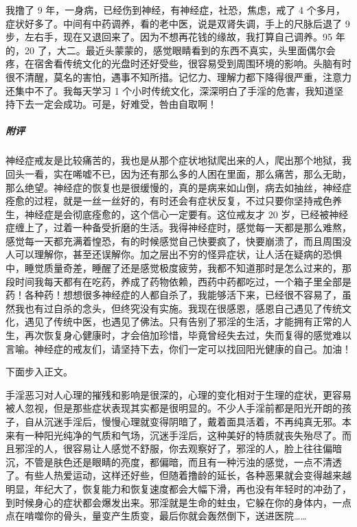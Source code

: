 \begin{case}
    我撸了 9 年，一身病，已经伤到神经，有神经症，社恐，焦虑，戒了 4 个多月，症状好多了。中间有中药调养，看的老中医，说是双肾失调，手上的尺脉后退了 9 步，左右手，现在又退回来了。因为不想再花钱的缘故，我打算自己调养。95 年的，20 了，大二。最近头蒙蒙的，感觉眼睛看到的东西不真实，头里面偶尔会疼，在宿舍看传统文化的光盘时还好受些，很容易受到周围环境的影响。头脑有时很不清醒，莫名的害怕，遇事不知所措。记忆力、理解力都下降得很严重，注意力还集中不了。我每天学习 1 个小时传统文化，深深明白了手淫的危害，我知道坚持下去一定会成功。可是，好难受，咎由自取啊！
    \subparagraph{附评} 神经症戒友是比较痛苦的，我也是从那个症状地狱爬出来的人，爬出那个地狱，我回头一看，实在唏嘘不已，因为还有那么多的人困在里面，那么痛苦，那么无助，那么绝望。神经症的恢复也是很缓慢的，真的是病来如山倒，病去如抽丝，神经症痊愈的过程，就是一丝一丝好的，有时还会有症状反复，不过只要你坚持戒色养生，神经症是会彻底痊愈的，这个信心一定要有。这位戒友才 20 岁，已经被神经症缠上了，过着一种备受折磨的生活。我得神经症时，感觉每一天都是那么难熬，感觉每一天都充满着惶恐，有的时候感觉自己快要疯了，快要崩溃了，而且周围没人可以理解你，甚至还误解你。加之层出不穷的怪异症状，让人活在疑病的恐惧中，睡觉质量奇差，睡醒了还是感觉极度疲劳，我都不知道那时是怎么过来的，那段时间我每天都有在吃药，养成了药物依赖，西药中药都吃过，一个箱子里全部是药！各种药！想想很多神经症的人都自杀了，我能够活下来，已经很不容易了，虽然我也有过自杀的念头，但终究没有实施。我现在很感恩，感恩自己遇见了传统文化，遇见了传统中医，也遇见了佛法。只有告别了邪淫的生活，才能拥有正常的人生，再次恢复身心健康时，才会倍加珍惜，毕竟曾经失去过，失而复得的感觉难以言喻。神经症的戒友们，请坚持下去，你们一定可以找回阳光健康的自己。加油！
\end{case}

下面步入正文。

手淫恶习对人心理的摧残和影响是很深的，心理的变化相对于生理的症状，更容易被人忽视，但是那些症状表现其实都是很明显的。不少人手淫前都是阳光开朗的孩子，自从沉迷手淫后，慢慢心理就变得阴暗了，戴着面具活着，不再纯真无邪。本来有一种阳光纯净的气质和气场，沉迷手淫后，这种美好的特质就丧失殆尽了。而且邪淫的人，很容易让人感觉不舒服，你去观察好了，邪淫的人，脸上往往偏暗沉，不管是肤色还是眼睛的亮度，都偏暗，而且有一种污浊的感觉，一点不清透了。有些人热爱运动，这样还好些，但随着撸龄的延长，各种恶果就会变得越来越明显，年纪大了，恢复能力和恢复速度都会大幅下滑，再也没有年轻时的冲劲了，到时候身心的症状都会爆发出来。邪淫就是生命的蛀虫，它躲在你的身体内，一点点在啃噬你的骨头，量变产生质变，最后你就会轰然倒下，送进医院……

